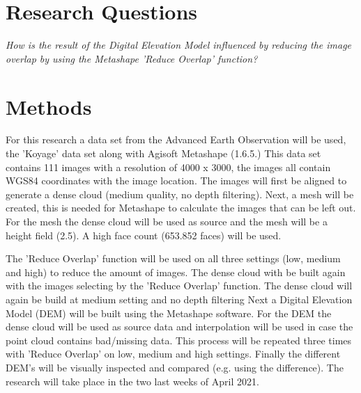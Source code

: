 \documentclass{article}
\begin{document}
\section{Research Questions} 

\emph{How is the result of the Digital Elevation Model influenced by reducing the image overlap by using the Metashape 'Reduce Overlap' function?}

\section{Methods}
For this research a data set from the Advanced Earth Observation will be used, the 'Koyage' data set along with Agisoft Metashape (1.6.5.)
This data set contains 111 images with a resolution of 4000 x 3000, the images all contain WGS84 coordinates with the image location. 
The images will first be aligned to generate a dense cloud (medium quality, no depth filtering).
Next, a mesh will be created, this is needed for Metashape to calculate the images that can be left out.
For the mesh the dense cloud will be used as source and the mesh will be a height field (2.5).
A high face count (653.852 faces) will be used.

The 'Reduce Overlap' function will be used on all three settings (low, medium and high) to reduce the amount of images. 
The dense cloud with be built again with the images selecting by the 'Reduce Overlap' function.
The dense cloud will again be build at medium setting and no depth filtering
Next a Digital Elevation Model (DEM) will be built using the Metashape software.
For the DEM the dense cloud will be used as source data and interpolation will be used in case the point cloud contains bad/missing data.
This process will be repeated three times with 'Reduce Overlap' on low, medium and high settings.
Finally the different DEM's will be visually inspected and compared (e.g. using the difference). 
The research will take place in the two last weeks of April 2021.


\end{document}
